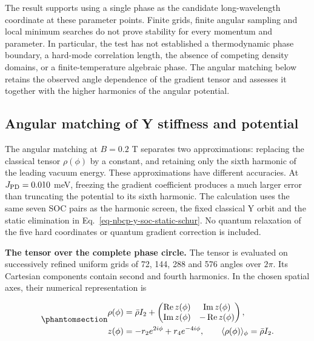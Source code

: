The result supports using a single phase as the candidate
long-wavelength coordinate at these parameter points. Finite grids,
finite angular sampling and local minimum searches do not prove
stability for every momentum and parameter. In particular, the test has
not established a thermodynamic phase boundary, a hard-mode correlation
length, the absence of competing density domains, or a
finite-temperature algebraic phase. The angular matching below retains
the observed angle dependence of the gradient tensor and assesses it
together with the higher harmonics of the angular potential.

\subsection{Angular matching of Y stiffness and
potential}\label{sec-nbcp-y-angular-matching}

The angular matching at \(B=0.2\) T separates two approximations:
replacing the classical tensor \(\rho(\phi)\) by a constant, and
retaining only the sixth harmonic of the leading vacuum energy. These
approximations have different accuracies. At \(J_{\rm PD}=0.010\) meV,
freezing the gradient coefficient produces a much larger error than
truncating the potential to its sixth harmonic. The calculation uses the
same seven SOC pairs as the harmonic screen, the fixed classical Y orbit
and the static elimination in Eq.~\ref{eq-nbcp-y-soc-static-schur}. No
quantum relaxation of the five hard coordinates or quantum gradient
correction is included.

\textbf{The tensor over the complete phase circle.} The tensor is
evaluated on successively refined uniform grids of 72, 144, 288 and 576
angles over \(2\pi\). Its Cartesian components contain second and fourth
harmonics. In the chosen spatial axes, their numerical representation is

\begin{equation}\phantomsection\label{eq-nbcp-y-angular-tensor}{
\begin{aligned}
\rho(\phi)&=\bar\rho I_2+
\begin{pmatrix}\operatorname{Re}z(\phi)&\operatorname{Im}z(\phi)\\
\operatorname{Im}z(\phi)&-\operatorname{Re}z(\phi)\end{pmatrix},\\
z(\phi)&=-r_2 e^{2i\phi}+r_4 e^{-4i\phi},\qquad
\langle\rho(\phi)\rangle_\phi=\bar\rho I_2.
\end{aligned}
}\end{equation}


